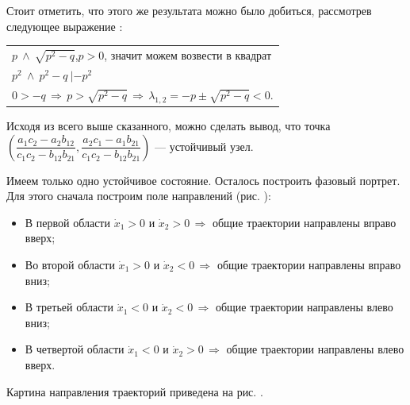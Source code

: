 \documentclass[12pt,a4paper]{article}
\begin{document}
\begin{enumerate}
        Стоит отметить, что этого же результата можно было добиться, рассмотрев следующее выражение :
        \begin{table}[h]
            \centering
            \begin{tabular}{l}
                $ p \ \wedge \ \sqrt{p^2 - q} $,\quad $ p > 0 $, значит можем возвести в квадрат
                \\[0.5em]
                $ p^2 \ \wedge \ p^2 - q \ | - p^2 $
                \\[0.5em]
                $ 0 > -q \,\Rightarrow\, p > \sqrt{p^2 - q} \,\Rightarrow\, \lambda_{1,2} = -p \pm \sqrt{p^2 - q} < 0$.
            \end{tabular}
        \end{table}

        Исходя из всего выше сказанного, можно сделать вывод, что точка \\[0.5em]$ \left( \dfrac{a_1 c_2 - a_2 b_{12}}{c_1 c_2 - b_{12} b_{21}}, \dfrac{a_2 c_1 - a_1 b_{21}}{c_1 c_2 - b_{12} b_{21}} \right) $ --- устойчивый узел.
        \\
    \end{enumerate}

    \pagebreak
    Имеем только одно устойчивое состояние. Осталось построить фазовый портрет. Для этого сначала построим поле направлений (рис. ):

    \begin{itemize}
        \setlength\itemsep{0.4em}
        \item В первой области $ \dot x_1 > 0 $ и $ \dot x_2 > 0 \, \Rightarrow $ общие траектории направлены вправо вверх;
        \item Во второй области $ \dot x_1 > 0 $ и $ \dot x_2 < 0 \, \Rightarrow $ общие траектории направлены вправо вниз;
        \item В третьей области $ \dot x_1 < 0 $ и $ \dot x_2 < 0 \, \Rightarrow $ общие траектории направлены влево вниз;
        \item В четвертой области $ \dot x_1 < 0 $ и $ \dot x_2 > 0 \, \Rightarrow $ общие траектории направлены влево вверх.
    \end{itemize}

    Картина направления траекторий приведена на рис. .

\end{document}
